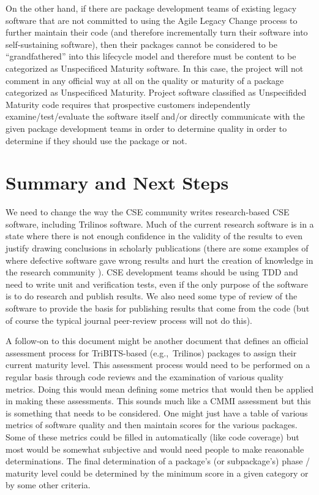 \documentclass[11pt]{SANDreport}
\begin{document}
On the other hand, if there are package development teams of existing
legacy software that are not committed to using the Agile Legacy
Change process to further maintain their code (and therefore
incrementally turn their software into self-sustaining software), then
their packages cannot be considered to be ``grandfathered'' into this
lifecycle model and therefore must be content to be categorized as
Unspecificed Maturity software.  In this case, the project will not
comment in any official way at all on the quality or maturity of a
package categorized as Unspecificed Maturity.  Project software
classified as Unspecifided Maturity code requires that prospective
customers independently examine/test/evaluate the software itself
and/or directly communicate with the given package development teams
in order to determine quality in order to determine if they should use
the package or not.


%
{}\section{Summary and Next Steps}
\label{sec:summary_next_steps}
%

We need to change the way the CSE community writes
research-based CSE software, including Trilinos software.  Much of the
current research software is in a state where there is not enough
confidence in the validity of the results to even justify drawing
conclusions in scholarly publications (there are some examples of
where defective software gave wrong results and hurt the creation of
knowledge in the research community
{}\cite{ScientistsNightmareFiveRetractions2006}).  CSE development
teams should be using TDD and need to write unit and verification
tests, even if the only purpose of the software is to do research and
publish results.  We also need some type of review of the
software to provide the basis for publishing results that come
from the code (but of course the typical journal peer-review process
will not do this).

A follow-on to this document might be another document that defines an
official assessment process for TriBITS-based (e.g.,\ Trilinos)
packages to assign their current maturity level.  This assessment
process would need to be performed on a regular basis through code
reviews and the examination of various quality metrics.  Doing this
would mean defining some metrics that would then be applied in making
these assessments. This sounds much like a CMMI assessment but this is
something that needs to be considered.  One might just have a table of
various metrics of software quality and then maintain scores for the
various packages.  Some of these metrics could be filled in
automatically (like code coverage) but most would be somewhat
subjective and would need people to make reasonable determinations.
The final determination of a package's (or subpackage's) phase /
maturity level could be determined by the minimum score in a given
category or by some other criteria.
\end{document}
